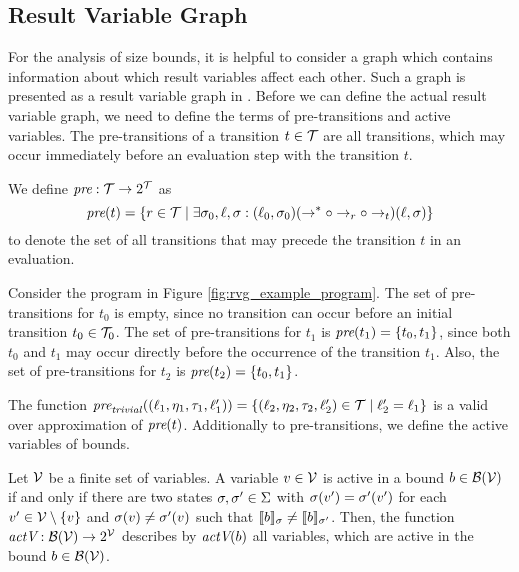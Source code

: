 \subsection{Result Variable Graph}

For the analysis of size bounds, it is helpful to consider a graph which contains information about which result variables affect each other.
Such a graph is presented as a result variable graph in \cite{koat}.
Before we can define the actual result variable graph, we need to define the terms of pre-transitions and active variables.
The pre-transitions of a transition $t \in \mathcal{T}$ are all transitions, which may occur immediately before an evaluation step with the transition $t$.

\begin{definition} 
  We define $\emph{pre}: \mathcal{T} \rightarrow 2^{\mathcal{T}}$ as
  \[\emph{pre}(t) = \lbrace r \in \mathcal{T} \mid \exists \sigma_0, \ell, \sigma: (\ell_0, \sigma_0) (\rightarrow^* \circ \rightarrow_r \circ \rightarrow_{t}) (\ell, \sigma) \rbrace\]
  to denote the set of all transitions that may precede the transition $t$ in an evaluation.	
\end{definition}

\begin{example} 
  
  Consider the program in Figure \ref{fig:rvg_example_program}.
  The set of pre-transitions for $t_0$ is empty, since no transition can occur before an initial transition $t_0 \in \mathcal{T}_0$.
  The set of pre-transitions for $t_1$ is $\emph{pre}(t_1) = \lbrace t_0, t_1 \rbrace$, since both $t_0$ and $t_1$ may occur directly before the occurrence of the transition $t_1$.
  Also, the set of pre-transitions for $t_2$ is $\emph{pre}(t_2) = \lbrace t_0, t_1 \rbrace$.
\end{example}

The function $\emph{pre}_{\mathit{trivial}}((\ell_1, \eta_1, \tau_1, \ell_1')) = \lbrace (\ell_2, \eta_2, \tau_2, \ell_2') \in \mathcal{T} \mid \ell_2' = \ell_1 \rbrace$ is a valid over approximation of $\emph{pre}(t)$.
Additionally to pre-transitions, we define the active variables of bounds. 

\begin{definition}
  Let $\mathcal{V}$ be a finite set of variables.  
  A variable $v \in \mathcal{V}$ is active in a bound $b \in \mathcal{B}(\mathcal{V})$ if and only if there are two states $\sigma, \sigma' \in \Sigma$ with $\sigma(v') = \sigma'(v')$ for each $v' \in \mathcal{V} \setminus \lbrace v \rbrace$ and $\sigma(v) \neq \sigma'(v)$ such that $\llbracket b \rrbracket_{\sigma} \neq \llbracket b \rrbracket_{\sigma'}$.
  Then, the function $\emph{actV}: \mathcal{B}(\mathcal{V}) \rightarrow 2^{\mathcal{V}}$ describes by $\emph{actV}(b)$ all variables, which are active in the bound $b \in \mathcal{B}(\mathcal{V})$.
\end{definition}

